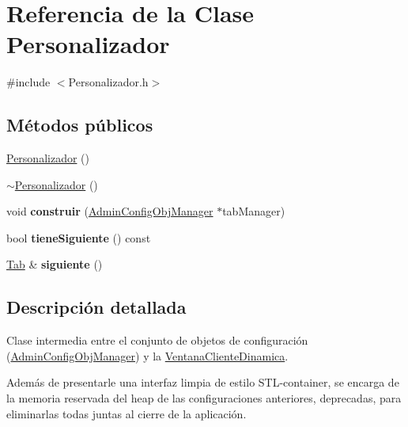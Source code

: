 \hypertarget{classPersonalizador}{\section{\-Referencia de la \-Clase \-Personalizador}
\label{classPersonalizador}
}


{\ttfamily \#include $<$\-Personalizador.\-h$>$}

\subsection*{\-Métodos públicos}
\begin{DoxyCompactItemize}
\item 
\hyperlink{classPersonalizador_a8072e7fe2f3c5c8d41b24d0c340aa98f}{\-Personalizador} ()
\item 
\hyperlink{classPersonalizador_ae6d72d7c6d287f32c651278c8b780350}{$\sim$\-Personalizador} ()
\item 
\hypertarget{classPersonalizador_a834e6b16827dc03a3337dbf1d2673596}{void {\bfseries construir} (\hyperlink{classAdminConfigObjManager}{\-Admin\-Config\-Obj\-Manager} $\ast$tab\-Manager)}\label{classPersonalizador_a834e6b16827dc03a3337dbf1d2673596}

\item 
\hypertarget{classPersonalizador_a61a607b9dc0e8ccc139d6a1d941fc730}{bool {\bfseries tiene\-Siguiente} () const }\label{classPersonalizador_a61a607b9dc0e8ccc139d6a1d941fc730}

\item 
\hypertarget{classPersonalizador_a0c38d818eac7b3eb1f694844b225d8c3}{\hyperlink{classTab}{\-Tab} \& {\bfseries siguiente} ()}\label{classPersonalizador_a0c38d818eac7b3eb1f694844b225d8c3}

\end{DoxyCompactItemize}


\subsection{\-Descripción detallada}
\-Clase intermedia entre el conjunto de objetos de configuración (\hyperlink{classAdminConfigObjManager}{\-Admin\-Config\-Obj\-Manager}) y la \hyperlink{classVentanaClienteDinamica}{\-Ventana\-Cliente\-Dinamica}.

\-Además de presentarle una interfaz limpia de estilo \-S\-T\-L-\/container, se encarga de la memoria reservada del heap de las configuraciones anteriores, deprecadas, para eliminarlas todas juntas al cierre de la aplicación. 

